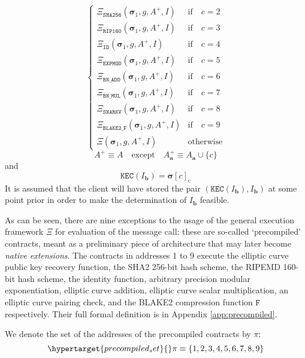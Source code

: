 \documentclass[9pt,oneside]{amsart}
\begin{document}
\begin{multicols}{2}
\begin{equation}
\begin{cases}
\Xi_{\mathtt{SHA256}}   (\boldsymbol{\sigma}_1, g, A^+, I) & \text{if} \quad c = 2 \\
\Xi_{\mathtt{RIP160}}   (\boldsymbol{\sigma}_1, g, A^+, I) & \text{if} \quad c = 3 \\
\Xi_{\mathtt{ID}}       (\boldsymbol{\sigma}_1, g, A^+, I) & \text{if} \quad c = 4 \\
\Xi_{\mathtt{EXPMOD}}   (\boldsymbol{\sigma}_1, g, A^+, I) & \text{if} \quad c = 5 \\
\Xi_{\mathtt{BN\_ADD}}  (\boldsymbol{\sigma}_1, g, A^+, I) & \text{if} \quad c = 6 \\
\Xi_{\mathtt{BN\_MUL}}  (\boldsymbol{\sigma}_1, g, A^+, I) & \text{if} \quad c = 7 \\
\Xi_{\mathtt{SNARKV}}   (\boldsymbol{\sigma}_1, g, A^+, I) & \text{if} \quad c = 8 \\
\Xi_{\mathtt{BLAKE2\_F}}(\boldsymbol{\sigma}_1, g, A^+, I) & \text{if} \quad c = 9 \\
\Xi                     (\boldsymbol{\sigma}_1, g, A^+, I) & \text{otherwise} \end{cases}
\end{equation}
\begin{equation}
A^+ \equiv A \quad \text{except} \quad A^+_{\mathbf{a}} \equiv A_{\mathbf{a}} \cup \{c\}
\end{equation}
and
\begin{equation}
\mathtt{KEC}(I_{\mathbf{b}}) = \boldsymbol{\sigma}[c]_{\mathrm{c}}
\end{equation}
It is assumed that the client will have stored the pair $(\mathtt{KEC}(I_{\mathbf{b}}), I_{\mathbf{b}})$ at some point prior in order to make the determination of $I_{\mathbf{b}}$ feasible.

As can be seen, there are nine exceptions to the usage of the general execution framework $\Xi$ for evaluation of the message call: these are so-called `precompiled' contracts, meant as a preliminary piece of architecture that may later become \textit{native extensions}.
The contracts in addresses 1 to 9 execute the elliptic curve public key recovery function, the SHA2 256-bit hash scheme, the RIPEMD 160-bit hash scheme, the identity function, arbitrary precision modular exponentiation, elliptic curve addition, elliptic curve scalar multiplication, an elliptic curve pairing check, and the BLAKE2 compression function $\mathtt{F}$ respectively.
Their full formal definition is in Appendix \ref{app:precompiled}.

We denote the set of the addresses of the precompiled contracts by $\pi$:
\begin{equation}\hypertarget{precompiled_set}{}
\pi \equiv \{1, 2, 3, 4, 5, 6, 7, 8, 9 \}
\end{equation}


\end{multicols}
\end{document}
